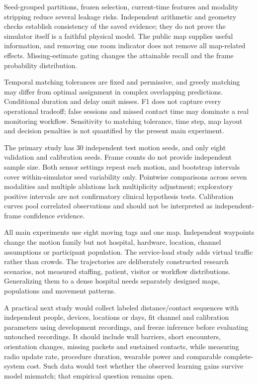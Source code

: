 \documentclass[12pt,a4paper]{report}
\begin{document}
Seed-grouped partitions, frozen selection, current-time features and modality stripping reduce several leakage risks. Independent arithmetic and geometry checks establish consistency of the saved evidence; they do not prove the simulator itself is a faithful physical model. The public map supplies useful information, and removing one room indicator does not remove all map-related effects. Missing-estimate gating changes the attainable recall and the frame probability distribution.

Temporal matching tolerances are fixed and permissive, and greedy matching may differ from optimal assignment in complex overlapping predictions. Conditional duration and delay omit misses. F1 does not capture every operational tradeoff; false sessions and missed contact time may dominate a real monitoring workflow. Sensitivity to matching tolerance, time step, map layout and decision penalties is not quantified by the present main experiment.

The primary study has 30 independent test motion seeds, and only eight validation and calibration seeds. Frame counts do not provide independent sample size. Both sensor settings repeat each motion, and bootstrap intervals cover within-simulator seed variability only. Pointwise comparisons across seven modalities and multiple ablations lack multiplicity adjustment; exploratory positive intervals are not confirmatory clinical hypothesis tests. Calibration curves pool correlated observations and should not be interpreted as independent-frame confidence evidence.

All main experiments use eight moving tags and one map. Independent waypoints change the motion family but not hospital, hardware, location, channel assumptions or participant population. The service-load study adds virtual traffic rather than crowds. The trajectories are deliberately constructed research scenarios, not measured staffing, patient, visitor or workflow distributions. Generalizing them to a dense hospital needs separately designed maps, populations and movement patterns.

A practical next study would collect labeled distance/contact sequences with independent people, devices, locations or days, fit channel and calibration parameters using development recordings, and freeze inference before evaluating untouched recordings. It should include wall barriers, short encounters, orientation changes, missing packets and sustained contacts, while measuring radio update rate, procedure duration, wearable power and comparable complete-system cost. Such data would test whether the observed learning gains survive model mismatch; that empirical question remains open.
\end{document}
